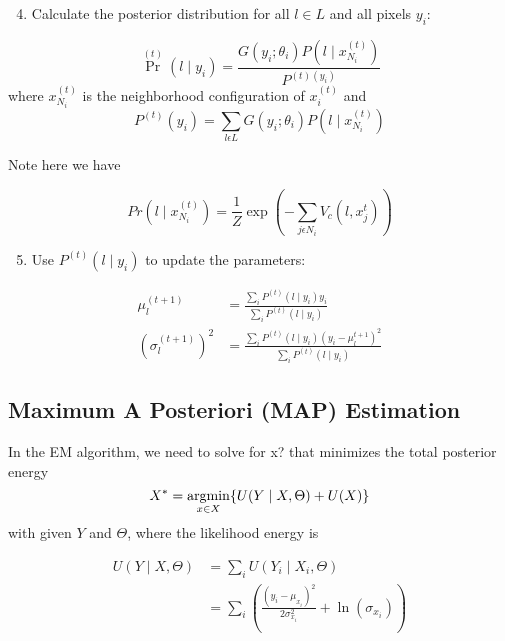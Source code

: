 \begin{enumerate}
	\setcounter{enumi}{3}
	\item Calculate the posterior distribution for all  \(l \in L\) and  all pixels \(y_i\):
\end{enumerate}
\begin{equation}
\Pr^{(t)}(l \mid y_i)=\frac{G(y_i;\theta_i)P(l \mid x^{(t)}_{N_i})}{P^{(t)(y_i)}}
\end{equation}
where \(x^{(t)}_{N_i}\) is the neighborhood configuration of \(x^{(t)}_i\)
and
\begin{equation}
P^{(t)}(y_i)={\sum\limits_{l \epsilon L} }G(y_i;\theta_i)P(l \mid x^{(t)}_{N_i})
\end{equation}

Note here we have

\begin{equation}
Pr(l \mid x^{(t)}_{N_i})=\frac{1}{Z}\exp(-{\sum\limits_{j \epsilon N_i}}V_c(l,x^t_j))
\end{equation}

\begin{enumerate}
	\setcounter{enumi}{4}
	\item Use \(P^{(t)}(l \mid y_i)\) to update the parameters: 
\end{enumerate}

\begin{equation}
\begin{split}
\mu^{(t+1)}_l & = \frac{{\sum\limits_{i}}P^{(t)}(l \mid y_i)y_i}{{\sum\limits_{i}}P^{(t)}(l \mid y_i)} \\
(\sigma^{(t+1)}_l)^2 & =\frac{{\sum\limits_{i}}P^{(t)}(l \mid y_i)(y_i-\mu^{t+1}_l)^2}{{\sum\limits_{i}}P^{(t)}(l \mid y_i)}
\end{split}
\end{equation}

\subsection{Maximum A Posteriori (MAP) Estimation}
In the EM algorithm, we need to solve for x? that minimizes
the total posterior energy
\begin{equation}\label{eq:MAp}
X^* = \operatorname*{argmin}_{x \in X} \{U( Y \mid X, \Theta) + U(X)\}
\end{equation}
with given $Y$ and $\Theta$, where the likelihood energy is

\begin{equation}
\begin{split}
U( Y \mid X, \Theta) & ={\sum\limits_{i}}U( Y_i \mid X_i, \Theta)\\
& = {\sum\limits_{i}}(\frac{(y_i-\mu_{x_i})^2}{2\sigma_{x_i}^2} + \ln(\sigma_{x_i}))
\end{split}
\end{equation}

